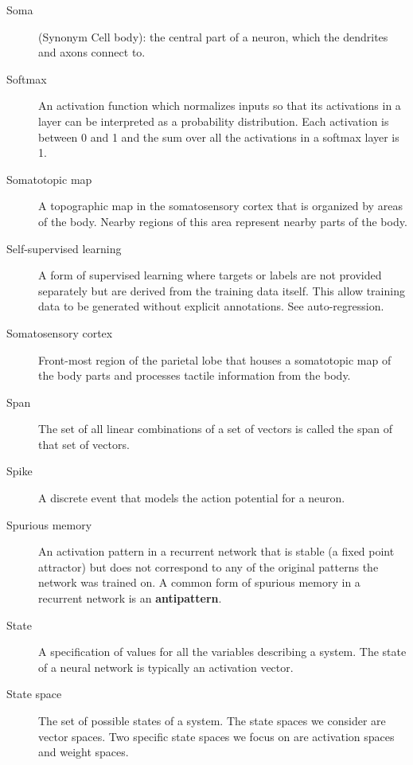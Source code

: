 \begin{description}

\item[Soma] (Synonym Cell body): the central part of a neuron, which the dendrites and axons connect to.

\item[Softmax] An activation function which normalizes inputs so that its activations in a layer can be interpreted as a probability distribution. Each activation is between 0 and 1 and the sum over all the activations in a softmax layer is 1. 

\item[Somatotopic map] A topographic map in the somatosensory cortex that is organized by areas of the body. Nearby regions of this area represent nearby parts of the body.

\item[Self-supervised learning] A form of supervised learning where targets or labels are not provided separately but are derived from the training data itself. This allow training data to be generated without explicit annotations. See auto-regression.

\item[Somatosensory cortex] Front-most region of the parietal lobe that houses a somatotopic map of the body parts and processes tactile information from the body.

\item[Span] The set of all linear combinations of a set of vectors is called the span of that set of vectors.

\item[Spike] A discrete event that models the action potential for a neuron.

\item[Spurious memory] An activation pattern in a recurrent network that is stable (a fixed point attractor) but does not correspond to any of the original patterns the network was trained on. A common form of spurious memory in a recurrent network is an \textbf{antipattern}.

\item[State] A specification of values for all the variables describing a system. The state of a neural network is typically an activation vector.

\item[State space] The set of possible states of a system. The state spaces we consider are vector spaces. Two specific state spaces we focus on are activation spaces and weight spaces.


\end{description}
